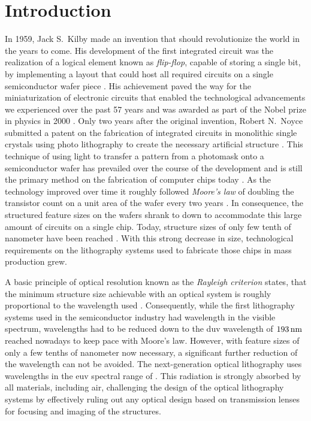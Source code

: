 \glsresetall
\chapter{Introduction} \label{ch:Intro}
In 1959, Jack S.~Kilby made an invention that should revolutionize the world in the years to come. His development of the first integrated circuit was the realization of a logical element known as \emph{flip-flop}, capable of storing a single bit, by implementing a layout that could host all required circuits on a single semiconductor wafer piece  \cite{kilby_invention_1976}. His achievement paved the way for the miniaturization of electronic circuits that enabled the technological advancements we experienced over the past 57 years and was awarded as part of the Nobel prize in physics in 2000 \cite{noauthor_press_nodate}. Only two years after the original invention, Robert N.~Noyce submitted a patent on the fabrication of integrated circuits in monolithic single crystals using photo lithography to create the necessary artificial structure \cite{noyce_semiconductor_1961}. This technique of using light to transfer a pattern from a photomask onto a semiconductor wafer has prevailed over the course of the development and is still the primary method on the fabrication of computer chips today \cite{mack_fundamental_2008}. As the technology improved over time it roughly followed \emph{Moore's law} of doubling the transistor count on a unit area of the wafer every two years \cite{moore_cramming_1998}. In consequence, the structured feature sizes on the wafers shrank to down to accommodate this large amount of circuits on a single chip. Today, structure sizes of only few tenth of nanometer have been reached \cite{international_roadmap_committee_international_2015}. With this strong decrease in size, technological requirements on the lithography systems used to fabricate those chips in mass production grew.

A basic principle of optical resolution known as the \emph{Rayleigh criterion} states, that the minimum structure size achievable with an optical system is roughly proportional to the wavelength used \cite{lord_rayleigh_xxxi._1879}. Consequently, while the first lithography systems used in the semiconductor industry had wavelength in the visible spectrum, wavelengths had to be reduced down to the \gls{duv} wavelength of $\nm{193}$ reached nowadays to keep pace with Moore's law. However, with feature sizes of only a few tenths of nanometer now necessary, a significant further reduction of the wavelength can not be avoided. The next-generation optical lithography uses wavelengths in the \gls{euv} spectral range of . This radiation is strongly absorbed by all materials, including air, challenging the design of the optical lithography systems by effectively ruling out any optical design based on transmission lenses for focusing and imaging of the structures.

